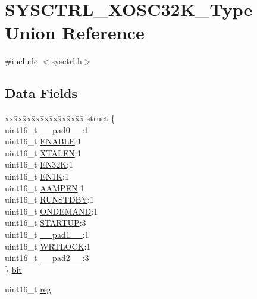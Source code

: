 \hypertarget{union_s_y_s_c_t_r_l___x_o_s_c32_k___type}{}\section{S\+Y\+S\+C\+T\+R\+L\+\_\+\+X\+O\+S\+C32\+K\+\_\+\+Type Union Reference}
\label{union_s_y_s_c_t_r_l___x_o_s_c32_k___type}


{\ttfamily \#include $<$sysctrl.\+h$>$}

\subsection*{Data Fields}
\begin{DoxyCompactItemize}
\item 
\begin{tabbing}
xx\=xx\=xx\=xx\=xx\=xx\=xx\=xx\=xx\=\kill
struct \{\\
\>uint16\_t \mbox{\hyperlink{union_s_y_s_c_t_r_l___x_o_s_c32_k___type_a77132c2c26a75f5b8751b235cda23828}{\_\_pad0\_\_}}:1\\
\>uint16\_t \mbox{\hyperlink{union_s_y_s_c_t_r_l___x_o_s_c32_k___type_aec203800ebef356dc04f3e8986a824d8}{ENABLE}}:1\\
\>uint16\_t \mbox{\hyperlink{union_s_y_s_c_t_r_l___x_o_s_c32_k___type_a213212644ef27e91b6ed7d8f995db6bf}{XTALEN}}:1\\
\>uint16\_t \mbox{\hyperlink{union_s_y_s_c_t_r_l___x_o_s_c32_k___type_a1a8e4dc0ff881c690f24e07ea8b93cd0}{EN32K}}:1\\
\>uint16\_t \mbox{\hyperlink{union_s_y_s_c_t_r_l___x_o_s_c32_k___type_a27dc75d91e7f572710e73563acbbe4de}{EN1K}}:1\\
\>uint16\_t \mbox{\hyperlink{union_s_y_s_c_t_r_l___x_o_s_c32_k___type_a039ee6dd57659b07d98647ac9671ccaf}{AAMPEN}}:1\\
\>uint16\_t \mbox{\hyperlink{union_s_y_s_c_t_r_l___x_o_s_c32_k___type_a0a98954fc108f309f3232355e809617b}{RUNSTDBY}}:1\\
\>uint16\_t \mbox{\hyperlink{union_s_y_s_c_t_r_l___x_o_s_c32_k___type_a93f43f8127aa6a27551de4ddad9cd47e}{ONDEMAND}}:1\\
\>uint16\_t \mbox{\hyperlink{union_s_y_s_c_t_r_l___x_o_s_c32_k___type_a33b016c487940487fff564ff0940cd5a}{STARTUP}}:3\\
\>uint16\_t \mbox{\hyperlink{union_s_y_s_c_t_r_l___x_o_s_c32_k___type_ab72e3a1f2f7db8695c60c658f5a0f11a}{\_\_pad1\_\_}}:1\\
\>uint16\_t \mbox{\hyperlink{union_s_y_s_c_t_r_l___x_o_s_c32_k___type_a356c7cc083fb5e02d9093189453a3e23}{WRTLOCK}}:1\\
\>uint16\_t \mbox{\hyperlink{union_s_y_s_c_t_r_l___x_o_s_c32_k___type_a82701c5ec65a0fca9a84d8edc46a8192}{\_\_pad2\_\_}}:3\\
\} \mbox{\hyperlink{union_s_y_s_c_t_r_l___x_o_s_c32_k___type_a39651f46456a1442f690dfde1e93090f}{bit}}\\

\end{tabbing}\item 
uint16\+\_\+t \mbox{\hyperlink{union_s_y_s_c_t_r_l___x_o_s_c32_k___type_a11760f5020019f4aa8cb02e694f7cc44}{reg}}
\end{DoxyCompactItemize}


